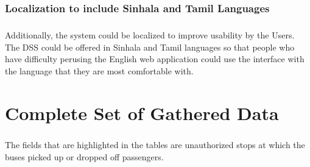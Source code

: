 \documentclass[12pt, oneside]{report}
\begin{document}
\subsection{Localization to include Sinhala and Tamil Languages}

\paragraph{} Additionally, the system could be localized to improve usability by the Users. The DSS could be offered in Sinhala and Tamil languages so that people who have difficulty perusing the English web application could use the interface with the language that they are most comfortable with.

\newpage


\appendix
\chapter{Complete Set of Gathered Data}
\label{appendix-CompleteSetOfData}

\paragraph{ } The fields that are highlighted in the tables are unauthorized stops at which the buses picked up or dropped off passengers.
\end{document}
